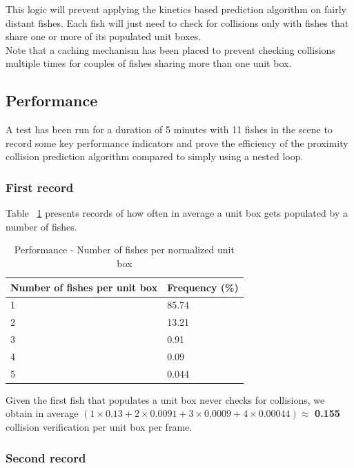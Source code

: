 This logic will prevent applying the kinetics based prediction algorithm on fairly distant fishes. Each fish will just need to check for collisions only with fishes that share one or more of its populated unit boxes.\\

Note that a caching mechanism has been placed to prevent checking collisions multiple times for couples of fishes sharing more than one unit box.\\

\subsection{Performance}
\label{subsec:performancerec}

A test has been run for a duration of 5 minutes with 11 fishes in the scene to record some key performance indicators and prove the efficiency of the proximity collision prediction algorithm compared to simply using a nested loop.

\subsubsection{First record}

Table ~\ref{tab:numberfishesunitbox} presents records of how often in average a unit box gets populated by a number of fishes.

\begin{table}[H]
\centering
\begin{tabular} { | l | l | }
\hline
\textbf{Number of fishes per unit box} & \textbf{Frequency (\%)} \\
\hline
1 & 85.74 \\
\hline
2 & 13.21 \\
\hline
3 & 0.91 \\
\hline
4 & 0.09 \\
\hline
5 & 0.044 \\
\hline
\end{tabular}
\caption{Performance - Number of fishes per normalized unit box}
\label{tab:numberfishesunitbox}
\end{table}

Given the first fish that populates a unit box never checks for collisions, we obtain in average $(1 \times 0.13 + 2 \times 0.0091 + 3 \times 0.0009 + 4 \times 0.00044) \approx$ \textbf{0.155}  collision verification per unit box per frame.

\subsubsection{Second record}

